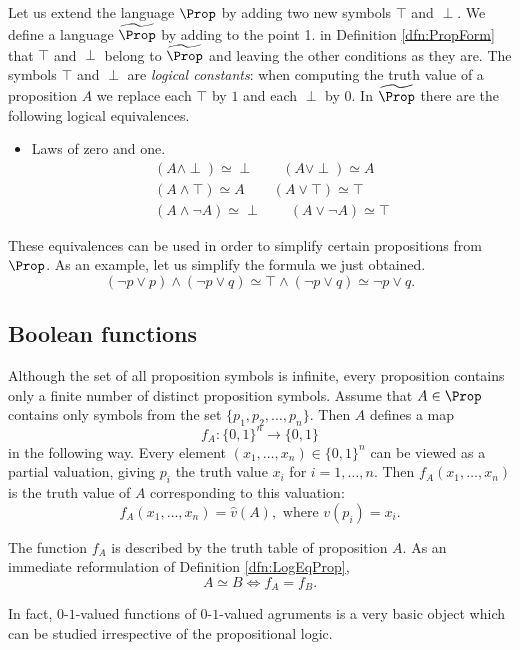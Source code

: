 \begin{page}
Let us extend the language $\Prop$ by adding two new symbols $\top$ and $\perp$.
We define a language $\widetilde{\Prop}$ by adding to the point 1. in Definition \ref{dfn:PropForm} that $\top$ and $\perp$ belong to $\widetilde{\Prop}$
and leaving the other conditions as they are.
The symbols $\top$ and $\perp$ are \emph{logical constants}: when computing the truth value of a proposition $A$
we replace each $\top$ by $1$ and each $\perp$ by $0$.
In $\widetilde{\Prop}$ there are the following logical equivalences.
\begin{itemize}
\item
Laws of zero and one.
\begin{gather*}
(A \wedge \perp) \simeq \perp \qquad (A \vee \perp) \simeq A\\
(A \wedge \top) \simeq A \qquad (A \vee \top) \simeq \top\\
(A \wedge \neg A) \simeq \perp \qquad (A \vee \neg A) \simeq \top
\end{gather*}
\end{itemize}

These equivalences can be used in order to simplify certain propositions from $\Prop$.
As an example, let us simplify the formula we just obtained.
\[
(\neg p \vee p) \wedge (\neg p \vee q) \simeq \top \wedge (\neg p \vee q) \simeq \neg p \vee q.
\]




\end{page}

\begin{page}

\subsection{Boolean functions}
Although the set of all proposition symbols is infinite,
every proposition contains only a finite number of distinct proposition symbols.
Assume that $A \in \Prop$ contains only symbols from the set $\{p_1, p_2, \ldots, p_n\}$.
Then $A$ defines a map
\[
f_A \colon \{0,1\}^n \to \{0,1\}
\]
in the following way.
Every element $(x_1, \ldots, x_n) \in \{0,1\}^n$ can be viewed as a partial valuation, giving $p_i$ the truth value $x_i$ for $i = 1, \ldots, n$.
Then $f_A(x_1, \ldots, x_n)$ is the truth value of $A$ corresponding to this valuation:
\[
f_A(x_1, \ldots, x_n) = \hat{v}(A), \text{ where } v(p_i) = x_i.
\]

The function $f_A$ is described by the truth table of proposition $A$.
As an immediate reformulation of Definition \ref{dfn:LogEqProp},
\[
A \simeq B \Leftrightarrow f_A = f_B.
\]

In fact, $0$-$1$-valued functions of $0$-$1$-valued agruments is a very basic object which can be studied irrespective of the propositional logic.

\end{page}

